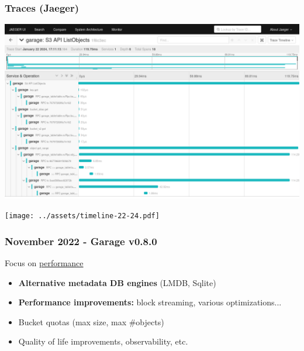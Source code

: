 \documentclass[aspectratio=169]{beamer}
\begin{document}
\begin{frame}
	\frametitle{Traces (Jaeger)}
	\begin{center}
		\includegraphics[width=.8\linewidth]{../assets/screenshots/jaeger_listobjects.png}
	\end{center}
\end{frame}


\begin{frame}
	\begin{center}
		\texttt{[image: ../assets/timeline-22-24.pdf]}
	\end{center}
\end{frame}

\begin{frame}
	\frametitle{November 2022 - Garage v0.8.0}
	Focus on \underline{performance}
	\vspace{2em}
	\begin{itemize}
		\item \textbf{Alternative metadata DB engines} (LMDB, Sqlite)
			\vspace{1em}
		\item \textbf{Performance improvements:} block streaming, various optimizations...
			\vspace{1em}
		\item Bucket quotas (max size, max \#objects)
			\vspace{1em}
		\item Quality of life improvements, observability, etc.
	\end{itemize}
\end{frame}
\end{document}

